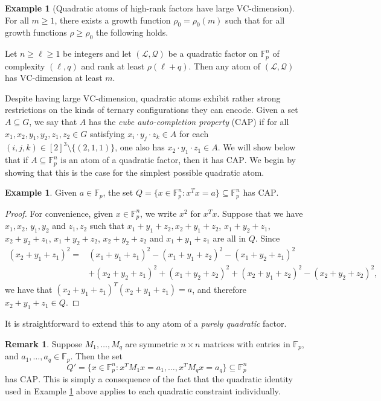 \documentclass[12pt,oneside,british,a4wide]{amsart}
\numberwithin{equation}{section}
\theoremstyle{definition}
\newtheorem{example}[theorem]{Example}
\newtheorem{remark}[theorem]{Remark}
\def\F{\mathbb{F}}
\def\VC{\mathrm{VC}}
\newcommand{\calL}{\mathcal{L}}
\newcommand{\calQ}{\mathcal{Q}}
\begin{document}
\begin{example}[Quadratic atoms of high-rank factors have large $\VC$-dimension]\label{exa:quadvc}
For all $m\geq 1$, there exists a growth function $\rho_0=\rho_0(m)$ such that  for all growth functions $\rho\geq \rho_0$ the following holds.

Let $n\geq \ell\geq 1$ be integers and let $(\calL,\calQ)$ be a quadratic factor on $\F_p^n$ of complexity $(\ell,q)$ and rank at least $\rho(\ell+q)$. Then any atom of $(\calL,\calQ)$ has $\VC$-dimension at least $m$. 
\end{example}

Despite having large $\VC$-dimension, quadratic atoms exhibit rather strong restrictions on the kinds of ternary configurations they can encode.  Given a set $A\subseteq G$, we say that $A$ has the \emph{cube auto-completion property} ($\mathrm{CAP}$) if for all $x_1,x_2,y_1,y_2,z_1,z_2\in G$ satisfying $x_i\cdot y_j \cdot z_k\in A$ for each $(i,j,k)\in [2]^3\setminus \{(2,1,1)\}$, one also has $x_2 \cdot y_1 \cdot z_1\in A$.  We will show below that if $A\subseteq \F_p^n$ is an atom of a quadratic factor, then it has $\mathrm{CAP}$.  We begin by showing that this is the case for the simplest possible quadratic atom. 

\begin{example}\label{exa:quadtame}
Given $a\in \F_p$, the set $Q=\{x\in \F_p^n:x^T x=a\}\subseteq \F_p^n$ has $\mathrm{CAP}$.
\end{example}

\begin{proof}
For convenience, given $x\in \F_p^n$, we write $x^2$ for $x^Tx$.  Suppose that we have $x_1,x_2$, $y_1,y_2$ and $z_1,z_2$ such that  $x_1+y_1+z_2, x_2+y_1+z_2$, $x_1+y_2+z_1$, $x_2+y_2+z_1$, $x_1+y_2+z_2$,   $x_2+y_2+z_2$ and $x_1+y_1+z_1$ are all in $Q$. Since
\begin{align*}
(x_2+y_1+z_1)^2=&(x_1+y_1+z_1)^2 -(x_1+y_1+z_2)^2-(x_1+y_2+z_1)^2\\&+(x_2+y_2+z_1)^2+(x_1+y_2+z_2)^2+(x_2+y_1+z_2)^2 - (x_2+y_2+z_2)^2,
\end{align*}
we have that $(x_2+y_1+z_1)^T (x_2+y_1+z_1)=a$, and therefore $x_2+y_1+z_1\in Q$.  
\end{proof}

It is straightforward to extend this to any atom of a \emph{purely quadratic} factor.

\begin{remark}\label{rem:highrankat} 
Suppose $M_1,\ldots, M_q$ are symmetric $n\times n$ matrices with entries in $\F_p$, and $a_1,\ldots, a_q\in \F_p$.  Then the set 
$$
Q'=\{x\in \F_p^n:x^T M_1 x=a_1,\dots, x^T M_q x=a_q\}\subseteq \F_p^n
$$ 
has $\mathrm{CAP}$. This is simply a consequence of the fact that the quadratic identity used in Example \ref{exa:quadtame} above applies to each quadratic constraint individually.
\end{remark}
\end{document}
